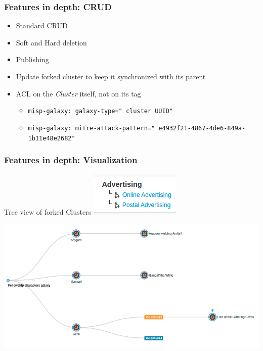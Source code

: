 \begin{frame}
    \frametitle{Features in depth: CRUD}
    \begin{itemize}
        \item Standard CRUD
        \item Soft and Hard deletion
        \item Publishing
        \item Update forked cluster to keep it synchronized with its parent
        \item ACL on the \textit{Cluster} itself, not on its tag
        \begin{itemize}
            \item \texttt{misp-galaxy:{\color{blue} galaxy-type}="{\color{red} cluster UUID}"}
            \item \texttt{\tiny misp-galaxy:{\color{blue} mitre-attack-pattern}="{\color{red} e4932f21-4867-4de6-849a-1b11e48e2682}"}
        \end{itemize}
    \end{itemize}
\end{frame}

\begin{frame}
    \frametitle{Features in depth: Visualization}
    Tree view of forked Clusters
    \includegraphics[scale=0.5]{pics/cluster-forks}
    \vspace{0.5em}
    \begin{center}
        \includegraphics[width=1.0\linewidth]{pics/cluster-forks-tree}
    \end{center}
\end{frame}

